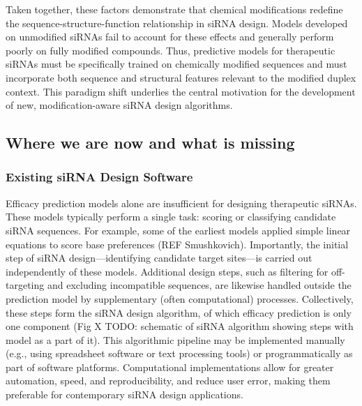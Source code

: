 \documentclass{report}
\begin{document}
Taken together, these factors demonstrate that chemical modifications redefine the sequence-structure-function relationship in siRNA design. Models developed on unmodified siRNAs fail to account for these effects and generally perform poorly on fully modified compounds. Thus, predictive models for therapeutic siRNAs must be specifically trained on chemically modified sequences and must incorporate both sequence and structural features relevant to the modified duplex context. This paradigm shift underlies the central motivation for the development of new, modification-aware siRNA design algorithms.


\subsection{Where we are now and what is missing}
\subsubsection{Existing siRNA Design Software}
Efficacy prediction models alone are insufficient for designing therapeutic siRNAs. These models typically perform a single task: scoring or classifying candidate siRNA sequences. For example, some of the earliest models applied simple linear equations to score base preferences (REF Smushkovich). Importantly, the initial step of siRNA design—identifying candidate target sites—is carried out independently of these models. Additional design steps, such as filtering for off-targeting and excluding incompatible sequences, are likewise handled outside the prediction model by supplementary (often computational) processes. Collectively, these steps form the siRNA design algorithm, of which efficacy prediction is only one component (Fig X TODO: schematic of siRNA algorithm showing steps with model as a part of it). This algorithmic pipeline may be implemented manually (e.g., using spreadsheet software or text processing tools) or programmatically as part of software platforms. Computational implementations allow for greater automation, speed, and reproducibility, and reduce user error, making them preferable for contemporary siRNA design applications.
\end{document}
